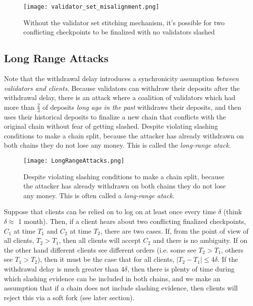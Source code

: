 \documentclass[12pt, final]{article}
\begin{document}
\begin{figure}[h!tb]
\centering
\texttt{[image: validator\_set\_misalignment.png]}
\caption{Without the validator set stitching mechanism, it's possible for two conflicting checkpoints to be finalized with no validators slashed}
\label{fig:dynamic2}
\end{figure}

\subsection{Long Range Attacks}

Note that the withdrawal delay introduces a synchronicity assumption \textit{between validators and clients}. Because validators can withdraw their deposits after the withdrawal delay, there is an attack where a coalition of validators which had more than $\frac{2}{3}$ of deposits \textit{long ago in the past} withdraws their deposits, and then uses their historical deposits to finalize a new chain that conflicts with the original chain without fear of getting slashed. Despite violating slashing conditions to make a chain split, because the attacker has already withdrawn on both chains they do not lose any money. This is called the \textit{long-range atack}.

\begin{figure}
\centering
\texttt{[image: LongRangeAttacks.png]}
\caption{Despite violating slashing conditions to make a chain split, because the attacker has already withdrawn on both chains they do not lose any money. This is often called a \textit{long-range atack}.}
\label{fig:dynamic3}
\end{figure}

Suppose that clients can be relied on to log on at least once every time $\delta$ (think $\delta \approx$ 1 month). Then, if a client hears about two conflicting finalized checkpoints, $C_1$ at time $T_1$ and $C_2$ at time $T_2$, there are two cases. If, from the point of view of all clients, $T_2 > T_1$, then all clients will accept $C_2$ and there is no ambiguity. If on the other hand different clients see different orders (i.e. some see $T_2 > T_1$, others see $T_1 > T_2$), then it must be the case that for all clients, $|T_2 - T_1| \le 4\delta$. If the withdrawal delay is much greater than $4\delta$, then there is plenty of time during which slashing evidence can be included in both chains, and we make an assumption that if a chain does not include slashing evidence, then clients will reject this via a soft fork (see later section).
\end{document}
